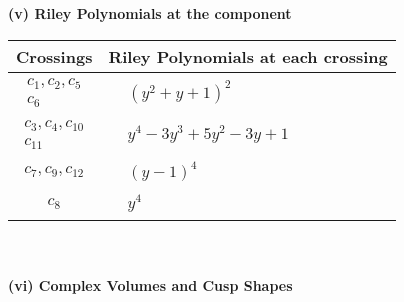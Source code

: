 \documentclass[1p]{elsarticle_modified}
\theoremstyle{definition}
\begin{document}
\newpage\renewcommand{\arraystretch}{1}
\flushleft \textbf{(v) Riley Polynomials at the component}\newline \\
\begin{tabular}{m{50pt}|m{274pt}}
Crossings & \hspace{64pt}Riley Polynomials at each crossing \\
\hline $$\begin{aligned}c_{1},c_{2},c_{5}\\c_{6}\end{aligned}$$&$\begin{aligned}
&(y^2+y+1)^2
\end{aligned}$\\
\hline $$\begin{aligned}c_{3},c_{4},c_{10}\\c_{11}\end{aligned}$$&$\begin{aligned}
&y^4-3 y^3+5 y^2-3 y+1
\end{aligned}$\\
\hline $$\begin{aligned}c_{7},c_{9},c_{12}\end{aligned}$$&$\begin{aligned}
&(y-1)^4
\end{aligned}$\\
\hline $$\begin{aligned}c_{8}\end{aligned}$$&$\begin{aligned}
&y^4
\end{aligned}$\\
\hline
\end{tabular}\\~\\
\newpage\flushleft \textbf{(vi) Complex Volumes and Cusp Shapes}
\end{document}
